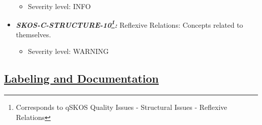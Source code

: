 \documentclass{llncs}
\begin{document}
\begin{itemize}
	\begin{itemize}
		\item Severity level: INFO
	\end{itemize}
	\item \textbf{{\em SKOS-C-STRUCTURE-10\footnote{Corresponds to qSKOS Quality Issues - Structural Issues - Reflexive Relations}:}}
	Reflexive Relations:
	Concepts related to themselves. 
	\begin{itemize}
		\item Severity level: WARNING
	\end{itemize}
\end{itemize}

\subsection{\underline{Labeling and Documentation}}
\end{document}
